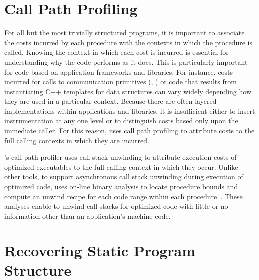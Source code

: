 \documentclass[11pt,letterpaper]{report}
\begin{document}
\section{Call Path Profiling}

For all but the most trivially structured programs, it is important to associate the costs incurred by each procedure with the contexts in which the procedure is called.
Knowing the context in which each cost is incurred is essential for understanding why the code performs as it does.
This is particularly important for code based on application frameworks and libraries.
For instance, costs incurred for calls to communication primitives (\eg{}, ) or code that results from instantiating C++ templates for data structures can vary widely depending how they are used in a particular context.
Because there are often layered implementations within applications and libraries, it is insufficient either to insert instrumentation at any one level or to distinguish costs based only upon the immediate caller.
For this reason, \HPCToolkit{} uses call path profiling to attribute costs to the full calling contexts in which they are incurred.

\HPCToolkit{}'s \hpcrun{} call path profiler uses call stack unwinding to attribute execution costs of optimized executables to the full calling context in which they occur.
Unlike other tools, to support asynchronous call stack unwinding during execution of optimized code, \hpcrun{} uses on-line binary analysis to locate procedure bounds and compute an unwind recipe for each code range within each procedure~\cite{Tallent-MC-Fagan:2009:PLDI-hpctoolkit-binary-analysis}.
These analyses enable \hpcrun{} to unwind call stacks for optimized code with little or no information other than an application's machine code. 

\begin{comment}
To attribute performance back to source code, \HPCToolkit{} combines a call path profile with information gleaned through post-mortem analysis of an application's object code and its debugging sections.
This post-mortem analysis of an executable recovers its program structure and reconstructs a mapping from instructions back to source lines, loops, inlined functions, and procedures.
\HPCToolkit{}'s ability to attribute costs to dynamic call paths, including loops and inlined functions, for optimized code without a special-purpose compiler is unique.
\end{comment}


\section{Recovering Static Program Structure}
\end{document}
